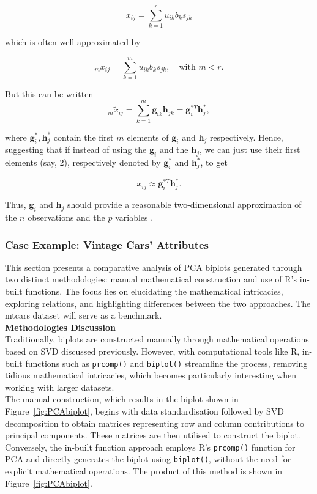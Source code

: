 \documentclass{article}\usepackage[]{graphicx}\usepackage[]{xcolor}
\numberwithin{equation}{section}
\begin{document}
\[
x_{ij} = \sum_{k=1}^{r} u_{ik}b_{k}s_{jk}
\]

\noindent which is often well approximated by

\[
_m\tilde{x}_{ij} = \sum_{k=1}^{m} u_{ik}b_{k}s_{jk}, \quad \text{with } m < r.
\]

\noindent But this can be written
\[
_m\tilde{x}_{ij} = \sum_{k=1}^{m} \mathbf{g}_{ik}\mathbf{h}_{jk} = \mathbf{g}_{i}^{*T}\mathbf{h}_{j}^{*},
\]

\noindent where $\mathbf{g}^*_{i}, \mathbf{h}^*_{j}$ contain the first $m$ elements of $\mathbf{g}_i$ and $\mathbf{h}_j$ respectively. Hence, suggesting that if instead of using the $\mathbf{g}_i$ and the $\mathbf{h}_j$, we can just use their first elements (say, 2), respectively denoted by  $\mathbf{g}_{i}^{*}$  and  $\mathbf{h}_{j}^{*}$, to get

\[ x_{ij} \approx \mathbf{g}_{i}^{*T}\mathbf{h}_{j}^{*}.\]

\noindent Thus, $\mathbf{g}_i$ and $\mathbf{h}_j$ should provide a reasonable two-dimensional approximation of the $n$ observations and the $p$ variables \cite{jolliffe2003principal}.\\

\subsubsection{Case Example: Vintage Cars' Attributes}

\noindent This section presents a comparative analysis of PCA biplots generated through two distinct methodologies: manual mathematical construction and use of R's in-built functions. The focus lies on elucidating the mathematical intricacies, exploring relations, and highlighting differences between the two approaches. The mtcars dataset will serve as a benchmark.\\

\noindent \textbf{Methodologies Discussion}\\
\noindent Traditionally, biplots are constructed manually through mathematical operations based on SVD discussed previously. However, with computational tools like R, in-built functions such as \texttt{prcomp()} and \texttt{biplot()} streamline the process, removing tidious mathematical intricacies, which becomes particularly interesting when working with larger datasets.\\

\noindent The manual construction, which results in the biplot shown in Figure~\ref{fig:PCAbiplot}, begins with data standardisation followed by SVD decomposition to obtain matrices representing row and column contributions to principal components. These matrices are then utilised to construct the biplot. Conversely, the in-built function approach employs R's \texttt{prcomp()} function for PCA and directly generates the biplot using \texttt{biplot()}, without the need for explicit mathematical operations. The product of this method is shown in Figure~\ref{fig:PCAbiplot}.
\end{document}
